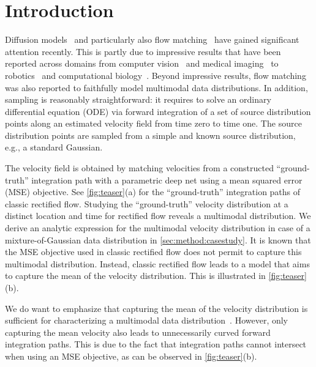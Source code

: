 \section{Introduction}
\label{sec:intro}
Diffusion models~\citep{ho2020denoising,song2021denoising,SongICLR2021} and particularly also flow matching~\citep{liu2023flow,LipmanICLR2023,albergo2023building,albergo2023stochastic} have gained significant attention recently. This is partly due to impressive results that have been reported across domains from computer vision~\citep{ho2020denoising} and medical imaging~\citep{song2022solving} to robotics~\citep{kapelyukh2023dall} and computational biology~\citep{guo2024diffusion}. Beyond impressive results, flow matching was also reported to faithfully model multimodal data distributions. In addition, sampling is reasonably straightforward: it requires to solve an ordinary differential equation (ODE) via forward integration of a set of source distribution points along an estimated velocity field from time zero to time one. The source distribution points are sampled from a simple and known source distribution, e.g., a standard Gaussian.


The velocity field is obtained by matching velocities from a constructed ``ground-truth'' integration path with a parametric deep net using a mean squared error (MSE) objective.
See \cref{fig:teaser}(a) for the ``ground-truth'' integration paths of classic rectified flow. 
Studying the ``ground-truth'' velocity distribution at a distinct location and time for %
rectified flow  reveals a multimodal distribution. We derive an analytic expression for the multimodal velocity distribution in case of a mixture-of-Gaussian data distribution in \cref{sec:method:casestudy}. It is known that the  MSE objective used in classic rectified flow does not permit to capture this multimodal distribution. Instead, classic rectified flow leads to a model that aims to capture the mean of the velocity distribution. This is illustrated in \cref{fig:teaser}(b). 

We do want to emphasize that capturing the mean of the velocity distribution is sufficient for characterizing a multimodal data distribution~\citep{liu2023flow}. However, only capturing the mean velocity also leads to unnecessarily curved forward integration paths. This is due to the fact that integration paths cannot intersect when using an MSE objective, as can be observed in \cref{fig:teaser}(b).


